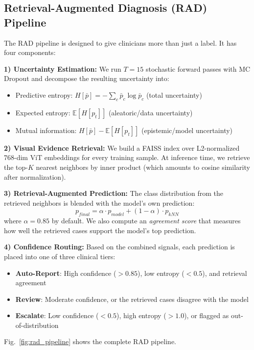 \documentclass[conference]{IEEEtran}
\begin{document}
\subsection{Retrieval-Augmented Diagnosis (RAD) Pipeline}

The RAD pipeline is designed to give clinicians more than just a label. It has four components:

\textbf{1) Uncertainty Estimation:} We run $T=15$ stochastic forward passes with MC Dropout and decompose the resulting uncertainty into:
\begin{itemize}
    \item Predictive entropy: $H[\bar{p}] = -\sum_c \bar{p}_c \log \bar{p}_c$ (total uncertainty)
    \item Expected entropy: $\mathbb{E}[H[p_t]]$ (aleatoric/data uncertainty)
    \item Mutual information: $H[\bar{p}] - \mathbb{E}[H[p_t]]$ (epistemic/model uncertainty)
\end{itemize}

\textbf{2) Visual Evidence Retrieval:} We build a FAISS index over L2-normalized 768-dim ViT embeddings for every training sample. At inference time, we retrieve the top-$K$ nearest neighbors by inner product (which amounts to cosine similarity after normalization).

\textbf{3) Retrieval-Augmented Prediction:} The class distribution from the retrieved neighbors is blended with the model's own prediction:
\begin{equation}
p_{final} = \alpha \cdot p_{model} + (1-\alpha) \cdot p_{kNN}
\end{equation}
where $\alpha=0.85$ by default. We also compute an \textit{agreement score} that measures how well the retrieved cases support the model's top prediction.

\textbf{4) Confidence Routing:} Based on the combined signals, each prediction is placed into one of three clinical tiers:
\begin{itemize}
    \item \textbf{Auto-Report}: High confidence ($>0.85$), low entropy ($<0.5$), and retrieval agreement
    \item \textbf{Review}: Moderate confidence, or the retrieved cases disagree with the model
    \item \textbf{Escalate}: Low confidence ($<0.5$), high entropy ($>1.0$), or flagged as out-of-distribution
\end{itemize}

\noindent Fig.~\ref{fig:rad_pipeline} shows the complete RAD pipeline.
\end{document}
